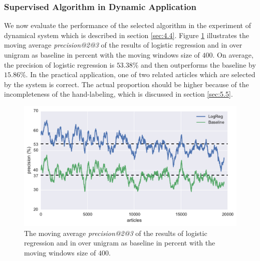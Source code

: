 \subsubsection{Supervised Algorithm in Dynamic Application}

We now evaluate the performance of the selected algorithm in the experiment of dynamical system which is described in section \ref{sec:4.4}. Figure \ref{fig:prec_supervised} illustrates the moving average \textit{precision@2@3} of the results of logistic regression and \tfidf{} in \icontent{} over unigram as baseline in percent with the moving windows size of $400$. On average, the precision of logistic regression is $53.38\%$ and then outperforms the baseline by $15.86\%$. In the practical application, one of two related articles which are selected by the system is correct. The actual proportion should be higher because of the incompleteness of the hand-labeling, which is discussed in section \ref{sec:5.5}.

\begin{figure}[!htb]
    \centering
    \includegraphics[width=\textwidth]{fig/precision_inc_supervised}
    \caption[The moving average \textit{precision@2@3} of the results of logistic regression and \tfidf{} in \icontent{} over unigram as baseline]{The moving average \textit{precision@2@3} of the results of logistic regression and \tfidf{} in \icontent{} over unigram as baseline in percent with the moving windows size of $400$.}
    \label{fig:prec_supervised}
\end{figure}